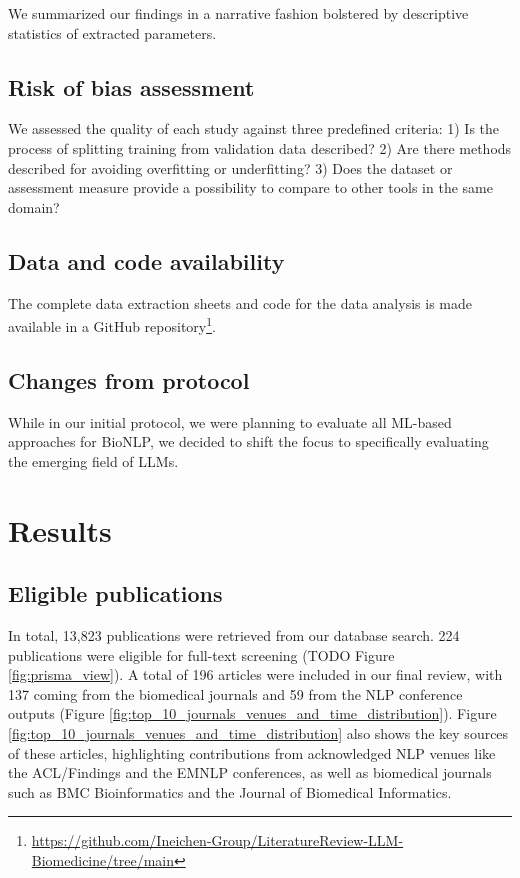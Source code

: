 \documentclass[fleqn,10pt]{olplainarticle}
\begin{document}
We summarized our findings in a narrative fashion bolstered by descriptive statistics of extracted parameters.


\subsection*{Risk of bias assessment}
We assessed the quality of each study against three predefined criteria: 1) Is the process of splitting training from validation data described? 2) Are there methods described for avoiding overfitting or underfitting?  3) Does the dataset or assessment measure provide a possibility to compare to other tools in the same domain?

\subsection*{Data and code availability}
The complete data extraction sheets and code for the data analysis is made available in a GitHub repository\footnote{\url{https://github.com/Ineichen-Group/LiteratureReview-LLM-Biomedicine/tree/main}}.

\subsection*{Changes from protocol}
While in our initial protocol, we were planning to evaluate all ML-based approaches for BioNLP, we decided to shift the focus to specifically evaluating the emerging field of LLMs. 

\section*{Results}
\label{sec:results}

\subsection*{Eligible publications}

In total, 13,823 publications were retrieved from our database search. 224 publications were eligible for full-text screening (TODO Figure \ref{fig:prisma_view}).
A total of 196 articles were included in our final review, with 137 coming from the biomedical journals and 59 from the NLP conference outputs (Figure \ref{fig:top_10_journals_venues_and_time_distribution}). Figure \ref{fig:top_10_journals_venues_and_time_distribution} also shows the key sources of these articles, highlighting contributions from acknowledged NLP venues like the ACL/Findings and the EMNLP conferences, as well as biomedical journals such as BMC Bioinformatics and the Journal of Biomedical Informatics.
\end{document}
